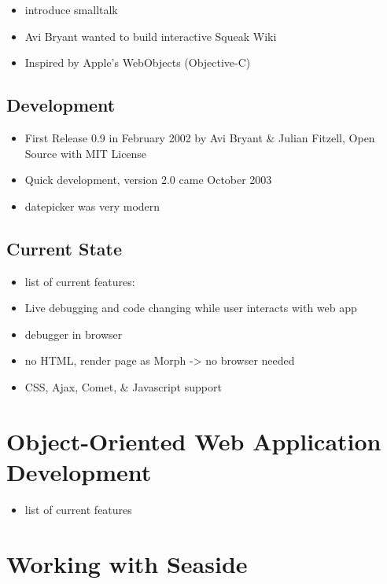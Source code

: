 \documentclass[a4paper,12pt,pagesize,headsepline,bibtotoc,titlepage]{scrartcl}
\begin{document}
\begin{itemize}
\item introduce smalltalk
\item Avi Bryant wanted to build interactive Squeak Wiki
\item Inspired by Apple’s WebObjects (Objective-C)
\end{itemize}

\subsection{Development}
\label{sec:dev} 


\begin{itemize}
\item First Release 0.9 in February 2002 by Avi Bryant \& Julian Fitzell, Open Source with MIT License
\item Quick development, version 2.0 came October 2003
\item datepicker was very modern
\end{itemize}

\subsection{Current State}
\label{sec:current} 

\begin{itemize}
\item list of current features:
\item Live debugging and code changing while user interacts with web app
\item debugger in browser
\item no HTML, render page as Morph -> no browser needed
\item CSS, Ajax, Comet, \& Javascript support
\end{itemize}

\section{Object-Oriented Web Application Development}


\begin{itemize}
\item list of current features
\end{itemize}


\section{Working with Seaside}
\label{sec:workflow}
\end{document}
